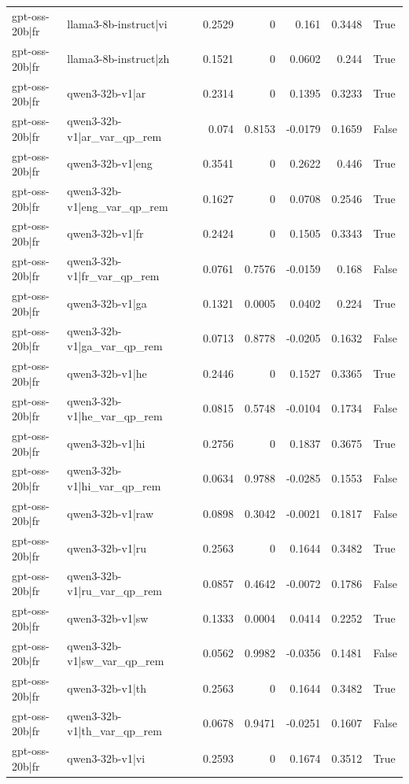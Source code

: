 \begin{table}
\begin{tabular}{l l r r r r l}
gpt-oss-20b|fr & llama3-8b-instruct|vi & 0.2529 & 0 & 0.161 & 0.3448 & True \\
gpt-oss-20b|fr & llama3-8b-instruct|zh & 0.1521 & 0 & 0.0602 & 0.244 & True \\
gpt-oss-20b|fr & qwen3-32b-v1|ar & 0.2314 & 0 & 0.1395 & 0.3233 & True \\
gpt-oss-20b|fr & qwen3-32b-v1|ar_var_qp_rem & 0.074 & 0.8153 & -0.0179 & 0.1659 & False \\
gpt-oss-20b|fr & qwen3-32b-v1|eng & 0.3541 & 0 & 0.2622 & 0.446 & True \\
gpt-oss-20b|fr & qwen3-32b-v1|eng_var_qp_rem & 0.1627 & 0 & 0.0708 & 0.2546 & True \\
gpt-oss-20b|fr & qwen3-32b-v1|fr & 0.2424 & 0 & 0.1505 & 0.3343 & True \\
gpt-oss-20b|fr & qwen3-32b-v1|fr_var_qp_rem & 0.0761 & 0.7576 & -0.0159 & 0.168 & False \\
gpt-oss-20b|fr & qwen3-32b-v1|ga & 0.1321 & 0.0005 & 0.0402 & 0.224 & True \\
gpt-oss-20b|fr & qwen3-32b-v1|ga_var_qp_rem & 0.0713 & 0.8778 & -0.0205 & 0.1632 & False \\
gpt-oss-20b|fr & qwen3-32b-v1|he & 0.2446 & 0 & 0.1527 & 0.3365 & True \\
gpt-oss-20b|fr & qwen3-32b-v1|he_var_qp_rem & 0.0815 & 0.5748 & -0.0104 & 0.1734 & False \\
gpt-oss-20b|fr & qwen3-32b-v1|hi & 0.2756 & 0 & 0.1837 & 0.3675 & True \\
gpt-oss-20b|fr & qwen3-32b-v1|hi_var_qp_rem & 0.0634 & 0.9788 & -0.0285 & 0.1553 & False \\
gpt-oss-20b|fr & qwen3-32b-v1|raw & 0.0898 & 0.3042 & -0.0021 & 0.1817 & False \\
gpt-oss-20b|fr & qwen3-32b-v1|ru & 0.2563 & 0 & 0.1644 & 0.3482 & True \\
gpt-oss-20b|fr & qwen3-32b-v1|ru_var_qp_rem & 0.0857 & 0.4642 & -0.0072 & 0.1786 & False \\
gpt-oss-20b|fr & qwen3-32b-v1|sw & 0.1333 & 0.0004 & 0.0414 & 0.2252 & True \\
gpt-oss-20b|fr & qwen3-32b-v1|sw_var_qp_rem & 0.0562 & 0.9982 & -0.0356 & 0.1481 & False \\
gpt-oss-20b|fr & qwen3-32b-v1|th & 0.2563 & 0 & 0.1644 & 0.3482 & True \\
gpt-oss-20b|fr & qwen3-32b-v1|th_var_qp_rem & 0.0678 & 0.9471 & -0.0251 & 0.1607 & False \\
gpt-oss-20b|fr & qwen3-32b-v1|vi & 0.2593 & 0 & 0.1674 & 0.3512 & True \\

\end{tabular}
\end{table}
